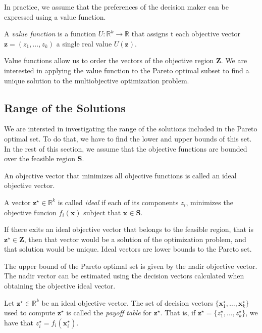 {In practice, we assume that the preferences of the decision maker can be expressed using a value function.

\begin{definition}
A \emph{value function} is a function $U : \mathbb{R}^k \rightarrow \mathbb{R}$ that assigns t each objective vector $\mathbf{z} = \left( z_1, \ldots, z_k \right)$ a single real value $U(\mathbf{z})$.
\end{definition}

Value functions allow us to order the vectors of the objective region $\mathbf{Z}$. We are interested in applying the value function to the Pareto optimal subset to find a unique solution to the multiobjective optimization problem.


\subsection{Range of the Solutions}

We are intersted in investigating the range of the solutions included in the Pareto optimal set. To do that, we have to find the lower and upper bounds of this set. In the rest of this section, we assume that the objective functions are bounded over the feasible region $\mathbf{S}$.

An objective vector that minimizes all objective functions is called an ideal objective vector.

\begin{definition}
A vector $\mathbf{z}^\star \in \mathbb{R}^k$ is called \emph{ideal} if each of its components $z_i$, minimizes the objective funcion $f_i \left( \mathbf{x} \right)$ subject that $\mathbf{x} \in \mathbf{S}$.
\end{definition}

If there exits an ideal objective vector that belongs to the feasible region, that is $\mathbf{z}^\star \in \mathbf{Z}$, then that vector would be a solution of the optimization problem, and that solution would be unique. Ideal vectors are lower bounds to the Pareto set.

The upper bound of the Pareto optimal set is given by the nadir objective vector. The nadir vector can be estimated using the decision vectors calculated when obtaining the objective ideal vector.

\begin{definition}
Let $\mathbf{z}^\star \in \mathbb{R}^k$ be an ideal objective vector. The set of decision vectors $\{ \mathbf{x}^\star_1, \ldots, \mathbf{x}^\star_k \}$ used to compute $\mathbf{z}^\star$ is called the \emph{payoff table} for $\mathbf{z}^\star$. That is, if $\mathbf{z}^\star = \{ z^\star_1, \ldots, z^\star_k \}$, we have that $z^\star_i = f_i \left( \mathbf{x}^\star_i \right)$.
\end{definition} 

}
